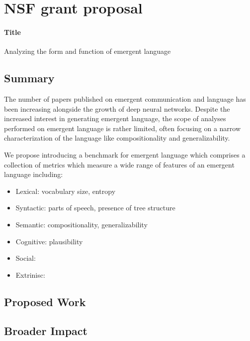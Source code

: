 \section{NSF grant proposal}

\paragraph{Title}
Analyzing the form and function of emergent language

\subsection{Summary}
The number of papers published on emergent communication and language has been increasing alongside the growth of deep neural networks.
Despite the increased interest in generating emergent language, the scope of analyses performed on emergent language is rather limited, often focusing on a narrow characterization of the language like compositionality and generalizability.

We propose introducing a benchmark for emergent language which comprises a collection of metrics which measure a wide range of features of an emergent language including:
\begin{itemize}
    \item Lexical: vocabulary size, entropy
    \item Syntactic: parts of speech, presence of tree structure
    \item Semantic: compositionality, generalizability
    \item Cognitive: plausibility
    \item Social:
    \item Extrinisc:
\end{itemize}

\subsection{Proposed Work}



\subsection{Broader Impact}

